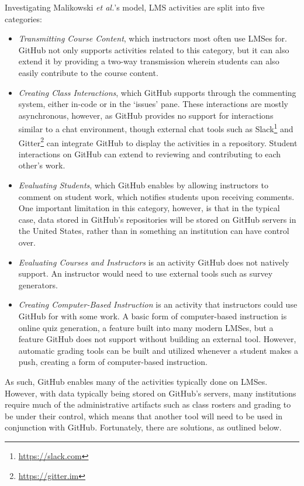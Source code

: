 Investigating Malikowski \textit{et al.}'s \cite{malikowski2007model} model, LMS activities are split into five categories:
\begin{itemize}
\item \emph{Transmitting Course Content}, which instructors most often use LMSes for. GitHub not only supports activities related to this category, but it can also extend it by providing a two-way transmission wherein students can also easily contribute to the course content.
\item \emph{Creating Class Interactions}, which GitHub supports through the commenting system, either in-code or in the `issues' pane. These interactions are mostly asynchronous, however, as GitHub provides no support for interactions similar to a chat environment, though external chat tools such as Slack\footnote{\url{https://slack.com}} and Gitter\footnote{\url{https://gitter.im}} can integrate GitHub to display the activities in a repository. Student interactions on GitHub can extend to reviewing and contributing to each other's work.
\item \emph{Evaluating Students}, which GitHub enables by allowing instructors to comment on student work, which notifies students upon receiving comments. One important limitation in this category, however, is that in the typical case, data stored in GitHub's repositories will be stored on GitHub servers in the United States, rather than in something an institution can have control over.
\item \emph{Evaluating Courses and Instructors} is an activity GitHub does not natively support. An instructor would need to use external tools such as survey generators.
\item \emph{Creating Computer-Based Instruction} is an activity that instructors could use GitHub for with some work. A basic form of computer-based instruction is online quiz generation, a feature built into many modern LMSes, but a feature GitHub does not support without building an external tool. However, automatic grading tools can be built and utilized whenever a student makes a push, creating a form of computer-based instruction.
\end{itemize}

As such, GitHub enables many of the activities typically done on LMSes. However, with data typically being stored on GitHub's servers, many institutions require much of the administrative artifacts such as class rosters and grading to be under their control, which means that another tool will need to be used in conjunction with GitHub. Fortunately, there are solutions, as outlined below.

